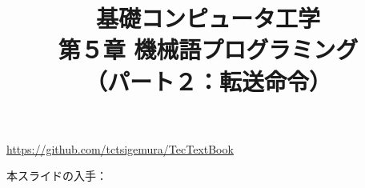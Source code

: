 \documentclass[handout]{beamer}        %
\begin{document}
\title{基礎コンピュータ工学\\第５章 機械語プログラミング\\
       （パート２：転送命令）}
\date{}

\begin{frame}
  \titlepage
  \centerline{\url{https://github.com/tctsigemura/TecTextBook}}
  \vfill
  \centerline{本スライドの入手：
    }
\end{frame}

\end{document}
